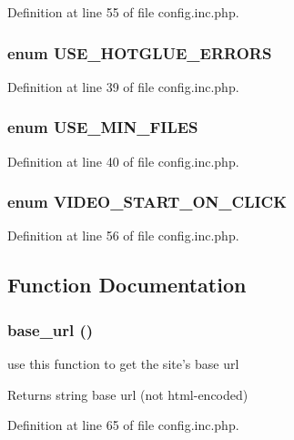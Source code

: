 Definition at line 55 of file config.inc.php.

\hypertarget{config_8inc_8php_a4be2ca4abd0486feb76708f3cf7e671d}{
\subsubsection[{USE\_\-HOTGLUE\_\-ERRORS}]{\setlength{\rightskip}{0pt plus 5cm}enum {\bf USE\_\-HOTGLUE\_\-ERRORS}}}
\label{config_8inc_8php_a4be2ca4abd0486feb76708f3cf7e671d}


Definition at line 39 of file config.inc.php.

\hypertarget{config_8inc_8php_a98806af9de0ea41a958d26c7e06b26a9}{
\subsubsection[{USE\_\-MIN\_\-FILES}]{\setlength{\rightskip}{0pt plus 5cm}enum {\bf USE\_\-MIN\_\-FILES}}}
\label{config_8inc_8php_a98806af9de0ea41a958d26c7e06b26a9}


Definition at line 40 of file config.inc.php.

\hypertarget{config_8inc_8php_ae1e42e1baa41f003453356a3747f9fee}{
\subsubsection[{VIDEO\_\-START\_\-ON\_\-CLICK}]{\setlength{\rightskip}{0pt plus 5cm}enum {\bf VIDEO\_\-START\_\-ON\_\-CLICK}}}
\label{config_8inc_8php_ae1e42e1baa41f003453356a3747f9fee}


Definition at line 56 of file config.inc.php.



\subsection{Function Documentation}
\hypertarget{config_8inc_8php_a8fdfb46e432b25bbdad23971a23a26b5}{
\subsubsection[{base\_\-url}]{\setlength{\rightskip}{0pt plus 5cm}base\_\-url ()}}
\label{config_8inc_8php_a8fdfb46e432b25bbdad23971a23a26b5}
use this function to get the site's base url

\begin{DoxyReturn}{Returns}
string base url (not html-\/encoded) 
\end{DoxyReturn}


Definition at line 65 of file config.inc.php.

